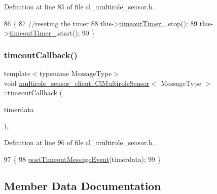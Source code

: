 Definition at line 85 of file cl\+\_\+multirole\+\_\+sensor.\+h.


\begin{DoxyCode}
86   \{
87     \textcolor{comment}{//reseting the timer}
88     this->\hyperlink{classmultirole__sensor__client_1_1ClMultiroleSensor_a1ac5801d1a126ebc3bd774bb001524fa}{timeoutTimer\_}.stop();
89     this->\hyperlink{classmultirole__sensor__client_1_1ClMultiroleSensor_a1ac5801d1a126ebc3bd774bb001524fa}{timeoutTimer\_}.start();
90   \}
\end{DoxyCode}
\mbox{\label{classmultirole__sensor__client_1_1ClMultiroleSensor_a9bd18eb64775ac8025ae3ef27d05d69b}} 
\subsubsection{\texorpdfstring{timeout\+Callback()}{timeoutCallback()}}
{\footnotesize\ttfamily template$<$typename Message\+Type$>$ \\
void \hyperlink{classmultirole__sensor__client_1_1ClMultiroleSensor}{multirole\+\_\+sensor\+\_\+client\+::\+Cl\+Multirole\+Sensor}$<$ Message\+Type $>$\+::timeout\+Callback (\begin{DoxyParamCaption}\item[{const ros\+::\+Timer\+Event \&}]{timerdata }\end{DoxyParamCaption})\hspace{0.3cm}{\ttfamily [inline]}, {\ttfamily [private]}}



Definition at line 96 of file cl\+\_\+multirole\+\_\+sensor.\+h.


\begin{DoxyCode}
97   \{
98     \hyperlink{classmultirole__sensor__client_1_1ClMultiroleSensor_a7453ad95c3b9bdffd4184e2d99cd0967}{postTimeoutMessageEvent}(timerdata);
99   \}
\end{DoxyCode}


\subsection{Member Data Documentation}
\mbox{\label{classmultirole__sensor__client_1_1ClMultiroleSensor_a6e7db1927a389af715f541837ac78d99}} 
